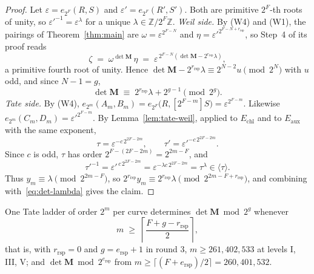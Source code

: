 \documentclass[version=preprint,notanonymous]{iacrcc}
\newcommand{\ers}{e_{\mathrm{rsp}}}
\newcommand{\rrs}{r_{\mathrm{rsp}}}
\newcommand{\Mm}{\mathbf{M}}
\begin{document}
\begin{proof}
Let $\varepsilon = e_{2^F}(R,S)$ and $\varepsilon' = e_{2^F}(R',S')$. Both are primitive
$2^F$-th roots of unity, so $\varepsilon'^{-1} = \varepsilon^{\lambda}$ for a unique
$\lambda \in \mathbb{Z}/2^F\mathbb{Z}$.
\emph{Weil side.} By (W4) and (W1), the pairings of Theorem~\ref{thm:main} are
$\omega = \varepsilon^{2^{F-N}}$ and $\eta = \varepsilon'^{2^{F-N+\rrs}}$, so
Step~4 of its proof reads
\[
  \zeta \;=\; \omega^{\det \Mm}\,\eta
  \;=\; \varepsilon^{\,2^{F-N}\left(\det \Mm - 2^{\rrs}\lambda\right)} ,
\]
a primitive fourth root of unity. Hence
$\det \Mm - 2^{\rrs}\lambda \equiv 2^{N-2} u \pmod{2^N}$ with $u$ odd, and since
$N - 1 = g$,
\begin{equation}\label{eq:det-lambda}
  \det \Mm \;\equiv\; 2^{\rrs}\lambda + 2^{g - 1} \pmod{2^{g}} .
\end{equation}
\emph{Tate side.} By (W4), $e_{2^m}(A_m,B_m) = e_{2^F}\bigl(R, [2^{F-m}]S\bigr)
= \varepsilon^{2^{F-m}}$. Likewise $e_{2^m}(C_m,D_m) = \varepsilon'^{2^{F-m}}$. By
Lemma~\ref{lem:tate-weil}, applied to $E_{\mathrm{chl}}$ and to $E_{\mathrm{aux}}$ with the
same exponent,
\[
  \tau = \varepsilon^{-c\,2^{2F-2m}}, \qquad \tau' = \varepsilon'^{-c\,2^{2F-2m}} .
\]
Since $c$ is odd, $\tau$ has order $2^{F-(2F-2m)} = 2^{2m-F}$, and
\[
  \tau'^{-1} = \varepsilon'^{\,c\,2^{2F-2m}}
  = \varepsilon^{-\lambda c\, 2^{2F-2m}} = \tau^{\lambda} \in \langle \tau \rangle .
\]
Thus $y_m \equiv \lambda \pmod{2^{2m-F}}$, so
$2^{\rrs} y_m \equiv 2^{\rrs}\lambda
\pmod{2^{2m-F+\rrs}}$, and combining with~\eqref{eq:det-lambda} gives the claim.
\end{proof}

\begin{corollary}\label{cor:tate-threshold}
One Tate ladder of order $2^m$ per curve determines $\det \Mm \bmod 2^g$ whenever
\[
  m \;\ge\; \left\lceil \frac{F + g - \rrs}{2} \right\rceil ,
\]
that is, with $\rrs = 0$ and $g = \ers + 1$ in round 3, $m \ge 261, 402,
533$ at levels I, III, V; and $\det \Mm \bmod 2^{\ers}$ from $m \ge
\lceil (F + \ers)/2 \rceil = 260, 401, 532$.
\end{corollary}
\end{document}
